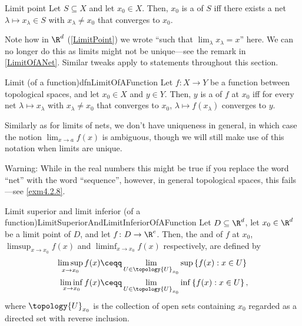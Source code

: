 \begin{dfn}{Limit point}{}
Let $S\subseteq X$ and let $x_0\in X$.  Then, $x_0$ is a  of $S$ iff there exists a net $\lambda \mapsto x_\lambda \in S$ with $x_\lambda \neq x_0$ that converges to $x_0$.
\begin{rmk}
Note how in $\R ^d$ (\cref{LimitPoint}) we wrote ``such that $\lim _{\lambda}x_{\lambda}=x$'' here.  We can no longer do this as limits might not be unique---see the remark in \cref{LimitOfANet}.  Similar tweaks apply to statements throughout this section.
\end{rmk}
\end{dfn}
\begin{dfn}{Limit (of a function)}{dfnLimitOfAFunction}
Let $f\colon X \rightarrow Y$ be a function between topological spaces, and let $x_0\in X$ and $y\in Y$.  Then, $y$ is a  of $f$ at $x_0$ iff for every net $\lambda \mapsto x_\lambda$ with $x_\lambda \neq x_0$ that converges to $x_0$, $\lambda \mapsto f(x_\lambda )$ converges to $y$.
\begin{rmk}
Similarly as for limits of nets, we don't have uniqueness in general, in which case the notion $\lim _{x\to a}f(x)$ is ambiguous, though we will still make use of this notation when limits are unique.
\end{rmk}
\begin{wrn}
Warning:  While in the real numbers this might be true if you replace the word ``net'' with the word ``sequence'', however, in general topological spaces, this fails---see \cref{exm4.2.8}.
\end{wrn}
\end{dfn}
\begin{dfn}{Limit superior and limit inferior (of a function)}{LimitSuperiorAndLimitInferiorOfAFunction}
Let $D\subseteq \R ^d$, let $x_0\in \R ^d$ be a limit point of $D$, and let $f\colon D\rightarrow \R ^e$.  Then, the  and  of $f$ at $x_0$, $\limsup _{x\to x_0}f(x)$ and $\liminf _{x\to x_0}f(x)$ respectively, are defined by
\begin{subequations}
\begin{align}
\limsup _{x\to x_0}f(x) & \ceqq \lim _{U\in \topology{U}_{x_0}}\sup \left\{ f(x):x\in U\right\} \\
\liminf _{x\to x_0}f(x)& \ceqq \lim _{U\in \topology{U}_{x_0}}\inf \left\{ f(x):x\in U\right\} ,
\end{align}
\end{subequations}
where $\topology{U}_{x_0}$ is the collection of open sets containing $x_0$ regarded as a directed set with reverse inclusion.
\end{dfn}

